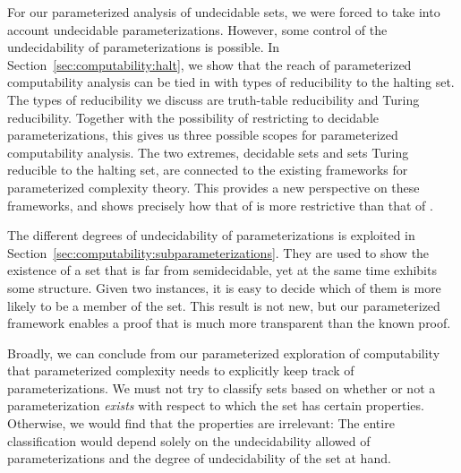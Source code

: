 For our parameterized analysis of undecidable sets, we were forced to take into account undecidable parameterizations.
However, some control of the undecidability of parameterizations is possible.
In Section~\ref{sec:computability:halt}, we show that the reach of parameterized computability analysis can be tied in with types of reducibility to the halting set.
The types of reducibility we discuss are truth-table reducibility and Turing reducibility.
Together with the possibility of restricting to decidable parameterizations, this gives us three possible scopes for parameterized computability analysis.
The two extremes, decidable sets and sets Turing reducible to the halting set, are connected to the existing frameworks for parameterized complexity theory.
This provides a new perspective on these frameworks, and shows precisely how that of \citeauthor{flum2006parameterized} is more restrictive than that of \citeauthor{downey1999parameterized}.

The different degrees of undecidability of parameterizations is exploited in Section~\ref{sec:computability:subparameterizations}.
They are used to show the existence of a set that is far from semidecidable, yet at the same time exhibits some structure.
Given two instances, it is easy to decide which of them is more likely to be a member of the set.
This result is not new, but our parameterized framework enables a proof that is much more transparent than the known proof.

Broadly, we can conclude from our parameterized exploration of computability that parameterized complexity needs to explicitly keep track of parameterizations.
We must not try to classify sets based on whether or not a parameterization \emph{exists} with respect to which the set has certain properties.
Otherwise, we would find that the properties are irrelevant:
The entire classification would depend solely on the undecidability allowed of parameterizations and the degree of undecidability of the set at hand.


